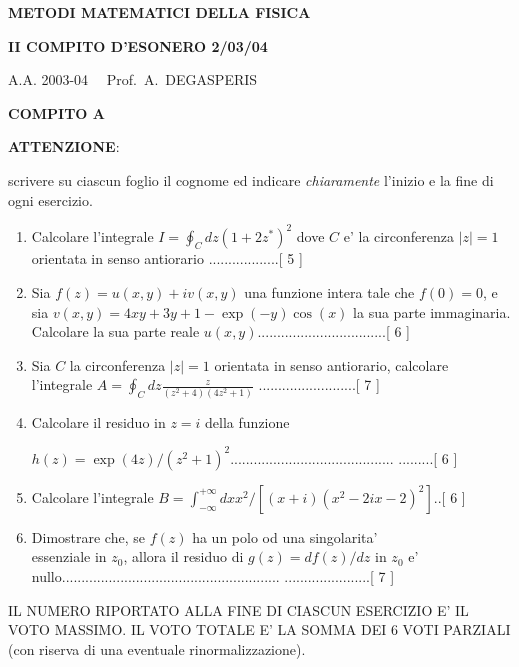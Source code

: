 \documentclass[,12pt]{article}
\begin{document}

\newpage

\centerline{\bf{METODI MATEMATICI DELLA FISICA}}

\centerline{\bf{II COMPITO D'ESONERO 2/03/04}}

\centerline{A.A. 2003-04 \ \ Prof.\ A.\ DEGASPERIS}

\centerline{\bf{COMPITO A}}
\vspace{20pt}
\noindent
{\bf ATTENZIONE}:

\noindent
scrivere su ciascun foglio il cognome ed indicare
\emph{chiaramente} l'inizio e la fine di ogni esercizio.
\vspace{20pt}
\noindent
\begin{enumerate}
\item Calcolare l'integrale $I=\oint_Cdz(1+2z^\ast)^2$ dove $C$ e' la
circonferenza $|z|=1$ orientata in senso antiorario 
..................[ 5 ] 
\item Sia $f(z)=u(x,y)+iv(x,y)$ una funzione intera
tale che $f(0)=0$, e sia $v(x,y)=4xy+3y+1-\exp(-y)
\cos(x)$ la sua parte immaginaria. Calcolare la sua
parte reale $u(x,y)$.................................[ 6 ]
\item Sia $C$ la
circonferenza $|z|=1$ orientata in senso antiorario, calcolare l'integrale
$A=\oint_Cdz\frac{z}{(z^2+4)(4z^2+1)}$
.........................[ 7 ]  
\item Calcolare il residuo in $z=i$ della funzione


$h(z)=\exp(4z)/(z^2+1)^2$..........................................
.........[ 6 ]
\item Calcolare l'integrale
$B=\int_{-\infty}^{+\infty}dxx^2/[(x+i)(x^2-2ix-2)^2]$..[ 6 ]
\item Dimostrare che, se $f(z)$ ha un polo od una singolarita'
\\essenziale in $z_0$, allora il residuo di $g(z)=df(z)/dz$ in $z_0$ e'
\\nullo........................................................
......................[ 7 ]
\end{enumerate}

\noindent IL NUMERO RIPORTATO ALLA FINE DI CIASCUN ESERCIZIO
E' IL VOTO MASSIMO. IL VOTO TOTALE E' LA SOMMA DEI 6 VOTI
PARZIALI (con riserva di una eventuale rinormalizzazione).

\newpage
\end{document}
